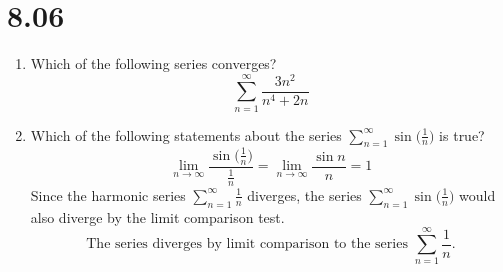 \documentclass[12pt]{article}
\begin{document}
\section*{8.06}
\begin{enumerate}
	\item Which of the following series converges?
	$$\boxed{\sum_{n=1}^{\infty} \frac{3n^2}{n^4+2n}}$$
	\item Which of the following statements about the series $\sum_{n=1}^{\infty} \sin\big(\frac{1}{n}\big)$ is true?
		$$\lim_{n\to\infty} \frac{\sin\big(\frac{1}{n}\big)}{\frac{1}{n}} = \lim_{n\to\infty} \frac{\sin n}{n} = 1$$ Since the harmonic series $\sum_{n=1}^{\infty} \frac{1}{n}$ diverges, the series $\sum_{n=1}^{\infty} \sin\big(\frac{1}{n}\big)$ would also diverge by the limit comparison test.
		$$\boxed{\text{The series diverges by limit comparison to the series $\sum_{n=1}^{\infty} \frac{1}{n}$}.}$$
		

\end{enumerate}
\end{document}
